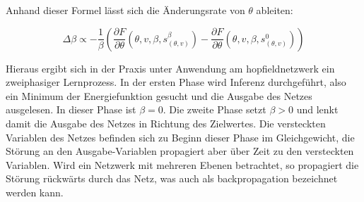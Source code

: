 Anhand dieser Formel lässt sich die Änderungsrate von \(\theta\) ableiten:

\[\Delta\beta\propto -\frac{1}{\beta}\left(\frac{\partial F}{\partial \theta}(\theta,v,\beta,s_{(\theta,v)}^\beta)-\frac{\partial F}{\partial \theta}(\theta,v,\beta,s_{(\theta,v)}^0)\right)\]

Hieraus ergibt sich in der Praxis unter Anwendung am \gls{hopfieldnetzwerk} ein zweiphasiger Lernprozess. In der ersten Phase wird Inferenz durchgeführt, also ein Minimum der Energiefunktion gesucht und die Ausgabe des Netzes ausgelesen. In dieser Phase ist \(\beta=0\). Die zweite Phase setzt \(\beta>0\) und lenkt damit die Ausgabe des Netzes in Richtung des Zielwertes. Die versteckten Variablen des Netzes befinden sich zu Beginn dieser Phase im Gleichgewicht, die Störung an den Ausgabe-Variablen propagiert aber über Zeit zu den versteckten Variablen. Wird ein Netzwerk mit mehreren Ebenen betrachtet, so propagiert die Störung rückwärts durch das Netz, was auch als \gls{backpropagation} bezeichnet werden kann. \cite{Scellier2017}
